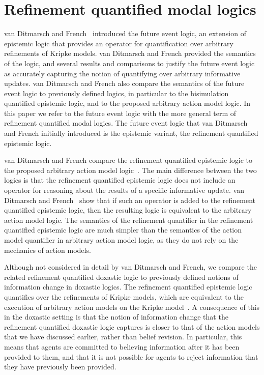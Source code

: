 \section{Refinement quantified modal logics}

van Ditmarsch and French~\cite{french2009simulation} introduced the future event
logic, an extension of epistemic logic that provides an operator for
quantification over arbitrary refinements of Kripke models. van Ditmarsch and
French provided the semantics of the logic, and several results and comparisons
to justify the future event logic as accurately capturing the notion of
quantifying over arbitrary informative updates. van Ditmarsch and French also
compare the semantics of the future event logic to previously defined logics, in
particular to the bisimulation quantified epistemic logic, and to the proposed
arbitrary action model logic. In this paper we refer to the future event logic
with the more general term of refinement quantified modal logics. The future
event logic that van Ditmarsch and French initially introduced is the epistemic
variant, the refinement quantified epistemic logic.

van Ditmarsch and French compare the refinement quantified epistemic logic to
the proposed arbitrary action model logic~\cite{french2009simulation}. The main
difference between the two logics is that the refinement quantified epistemic
logic does not include an operator for reasoning about the results of a specific
informative update. van Ditmarsch and French~\cite{french2009simulation} show
that if such an operator is added to the refinement quantified epistemic logic,
then the resulting logic is equivalent to the arbitrary action model logic. The
semantics of the refinement quantifier in the refinement quantified epistemic
logic are much simpler than the semantics of the action model quantifier in
arbitrary action model logic, as they do not rely on the mechanics of action
models.

Although not considered in detail by van Ditmarsch and French, we compare the
related refinement quantified doxastic logic to previously defined notions of
information change in doxastic logics. The refinement quantified epistemic logic
quantifies over the refinements of Kripke models, which are equivalent to the
execution of arbitrary action models on the Kripke
model~\cite{french2009simulation}. A consequence of this in the doxastic setting
is that the notion of information change that the refinement quantified doxastic
logic captures is closer to that of the action models that we have discussed
earlier, rather than belief revision. In particular, this means that agents are
committed to believing information after it has been provided to them, and that
it is not possible for agents to reject information that they have previously
been provided.

